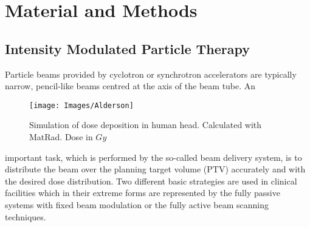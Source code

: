 \documentclass[12pt, a4paper, twoside]{book}
\begin{document}
\chapter{Material and Methods} %

\section{Intensity Modulated Particle Therapy}

Particle beams provided by cyclotron or synchrotron accelerators are typically narrow, pencil-like beams centred at the axis of the beam tube. An 
\begin{wrapfigure}{l}{.5\textwidth}
{\texttt{[image: Images/Alderson]}}
\caption{Simulation of dose deposition in human head. Calculated with MatRad. Dose in $Gy$}
\label{fig:alderson}
\vspace{-10mm}
\end{wrapfigure}
\noindent important task, which is performed by the so-called beam delivery system, is to distribute the beam over the planning target volume (PTV) accurately and with the desired dose distribution.
Two different basic strategies are used in clinical facilities which in their extreme forms are represented by the fully passive systems with fixed beam modulation or the fully active beam scanning techniques.
\end{document}
